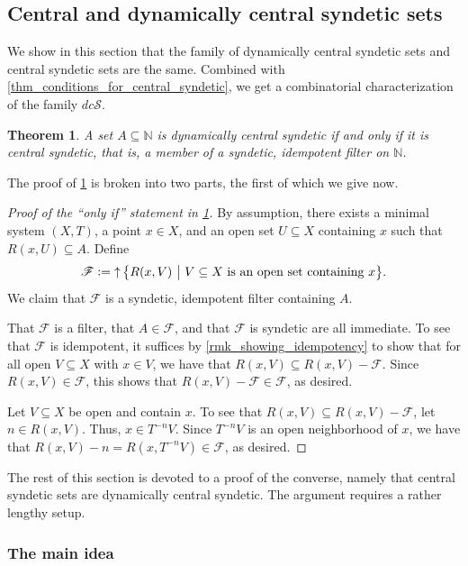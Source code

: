 \documentclass[letter,11pt]{article}
\theoremstyle{plain}
\newtheorem{theorem}{Theorem}
\theoremstyle{definition}
\theoremstyle{plain}
\theoremstyle{plain}
\numberwithin{equation}{section}
\newcommand{\N}{\mathbb{N}}
\newcommand{\defeq}{\vcentcolon=}
\DeclareMathOperator{\upclose}{\uparrow}
\newcommand{\dcsyndetic}{dc\mathcal{S}}
\newcommand{\filter}{\mathscr{F}}
\begin{document}
\subsection{Central and dynamically central syndetic sets}
\label{sec_char_of_dy_central_synd_sets}

We show in this section that the family of dynamically central syndetic sets and central syndetic sets are the same.  Combined with \cref{thm_conditions_for_central_syndetic}, we get a combinatorial characterization of the family $\dcsyndetic$.

\begin{theorem}
\label{thm_dcs_iff_cs}
    A set $A \subseteq \N$ is dynamically central syndetic if and only if it is central syndetic, that is, a member of a syndetic, idempotent filter on $\N$.
\end{theorem}

The proof of \cref{thm_dcs_iff_cs} is broken into two parts, the first of which we give now.

\begin{proof}[Proof of the ``only if'' statement in \cref{thm_dcs_iff_cs}]
    By assumption, there exists a minimal system $(X,T)$, a point $x \in X$, and an open set $U \subseteq X$ containing $x$ such that $R(x,U) \subseteq A$. Define
    \[
        \filter \defeq \upclose \big\{ R(x,V) \ \big| \ V \subseteq X \text{ is an open set containing $x$} \big\}.
    \]
    We claim that $\filter$ is a syndetic, idempotent filter containing $A$.

    That $\filter$ is a filter, that $A \in \filter$, and that $\filter$ is syndetic are all immediate.  To see that $\filter$ is idempotent, it suffices by \cref{rmk_showing_idempotency} to show that for all open $V \subseteq X$ with $x \in V$, we have that $R(x,V) \subseteq R(x,V) - \filter$.  Since $R(x,V) \in \filter$, this shows that $R(x,V) - \filter \in \filter$, as desired.

    Let $V \subseteq X$ be open and contain $x$.  To see that $R(x,V) \subseteq R(x,V) - \filter$, let $n \in R(x,V)$.  Thus, $x \in T^{-n} V$.  Since $T^{-n} V$ is an open neighborhood of $x$, we have that $R(x,V) - n = R(x,T^{-n} V) \in \filter$, as desired.
\end{proof}

The rest of this section is devoted to a proof of the converse, namely that central syndetic sets are dynamically central syndetic.  The argument requires a rather lengthy setup.

\subsubsection{The main idea}
\label{sec_main_idea_of_shift_punch}
\end{document}
